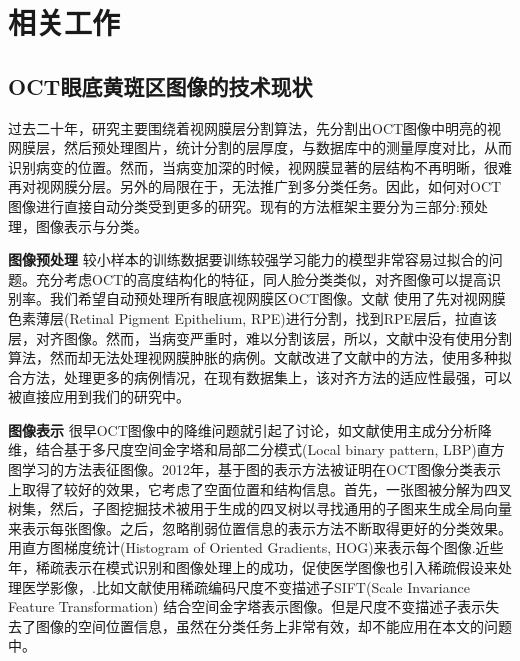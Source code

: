 \section{相关工作}

    \subsection{OCT眼底黄斑区图像的技术现状}
    过去二十年，研究主要围绕着视网膜层分割算法\cite{antony2013combined,savastano2014differential}，先分割出OCT图像中明亮的视网膜层，然后预处理图片，统计分割的层厚度，与数据库中的测量厚度对比，从而识别病变的位置。然而，当病变加深的时候，视网膜显著的层结构不再明晰，很难再对视网膜分层。另外的局限在于，无法推广到多分类任务。因此，如何对OCT图像进行直接自动分类受到更多的研究。现有的方法框架主要分为三部分:预处理，图像表示与分类。

    \textbf{图像预处理}
    较小样本的训练数据要训练较强学习能力的模型非常容易过拟合的问题\cite{srivastava2014dropout}。充分考虑OCT的高度结构化的特征，同人脸分类类似，对齐图像可以提高识别率\cite{cao2014face}。我们希望自动预处理所有眼底视网膜区OCT图像。文献 使用了先对视网膜色素薄层(Retinal Pigment Epithelium, RPE)进行分割，找到RPE层后，拉直该层，对齐图像。然而，当病变严重时，难以分割该层，所以，文献中没有使用分割算法，然而却无法处理视网膜肿胀的病例。文献改进了文献中的方法，使用多种拟合方法，处理更多的病例情况，在现有数据集上，该对齐方法的适应性最强，可以被直接应用到我们的研究中。

    \textbf{图像表示}
    很早OCT图像中的降维问题就引起了讨论，如文献使用主成分分析降维，结合基于多尺度空间金字塔和局部二分模式(Local binary pattern, LBP)直方图学习的方法表征图像。2012年，基于图的表示方法被证明在OCT图像分类表示上取得了较好的效果\cite{zheng2012automated,hijazi2012data}，它考虑了空面位置和结构信息。首先，一张图被分解为四叉树集，然后，子图挖掘技术被用于生成的四叉树以寻找通用的子图来生成全局向量来表示每张图像。之后，忽略削弱位置信息的表示方法不断取得更好的分类效果\cite{srinivasan2014fully}。用直方图梯度统计(Histogram of Oriented Gradients, HOG)来表示每个图像.近些年，稀疏表示在模式识别和图像处理上的成功，促使医学图像也引入稀疏假设来处理医学影像，\cite{oliveira2014medical,wang2015predict,afzali2016medical}.比如文献使用稀疏编码尺度不变描述子SIFT(Scale Invariance Feature Transformation) 结合空间金字塔表示图像。但是尺度不变描述子表示失去了图像的空间位置信息，虽然在分类任务上非常有效，却不能应用在本文的问题中。

